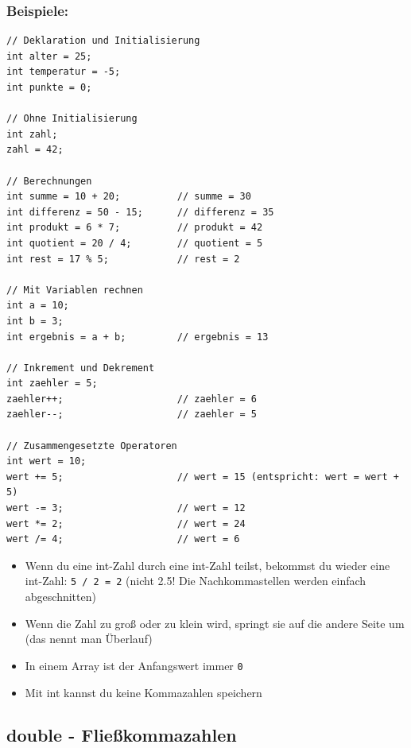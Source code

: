 \subsubsection*{Beispiele:}
\begin{lstlisting}
// Deklaration und Initialisierung
int alter = 25;
int temperatur = -5;
int punkte = 0;

// Ohne Initialisierung
int zahl;
zahl = 42;

// Berechnungen
int summe = 10 + 20;          // summe = 30
int differenz = 50 - 15;      // differenz = 35
int produkt = 6 * 7;          // produkt = 42
int quotient = 20 / 4;        // quotient = 5
int rest = 17 % 5;            // rest = 2

// Mit Variablen rechnen
int a = 10;
int b = 3;
int ergebnis = a + b;         // ergebnis = 13

// Inkrement und Dekrement
int zaehler = 5;
zaehler++;                    // zaehler = 6
zaehler--;                    // zaehler = 5

// Zusammengesetzte Operatoren
int wert = 10;
wert += 5;                    // wert = 15 (entspricht: wert = wert + 5)
wert -= 3;                    // wert = 12
wert *= 2;                    // wert = 24
wert /= 4;                    // wert = 6
\end{lstlisting}

\begin{achtung}
	\begin{itemize}
		\item Wenn du eine int-Zahl durch eine int-Zahl teilst, bekommst du wieder eine int-Zahl: \texttt{5 / 2 = 2} (nicht 2.5! Die Nachkommastellen werden einfach abgeschnitten)
		\item Wenn die Zahl zu groß oder zu klein wird, springt sie auf die andere Seite um (das nennt man Überlauf)
		\item In einem Array ist der Anfangswert immer \texttt{0}
		\item Mit int kannst du keine Kommazahlen speichern
	\end{itemize}
\end{achtung}

\newpage


\subsection*{double - Fließkommazahlen}

